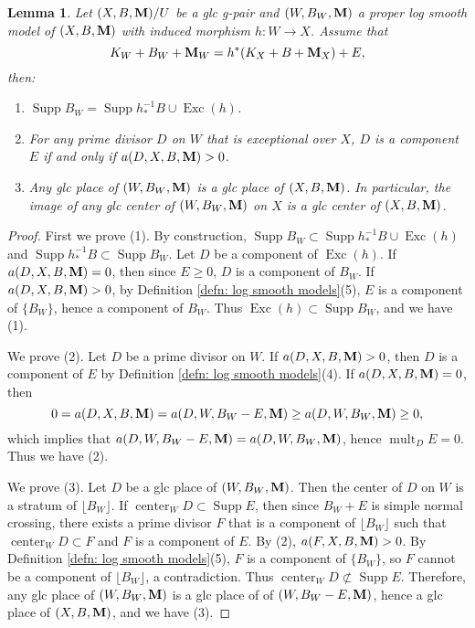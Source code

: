 \documentclass[11pt]{amsart}
\numberwithin{equation}{section}
\newcommand{\Mm}{{\bf{M}}}
\newcommand{\Center}{\operatorname{center}}
\newcommand{\Exc}{\operatorname{Exc}}
\newcommand{\Supp}{\operatorname{Supp}}
\newcommand{\mult}{\operatorname{mult}}
\newtheorem{lem}[thm]{Lemma}
\theoremstyle{definition}
\theoremstyle{definition}
\theoremstyle{definition}
\begin{document}
\begin{lem}\label{lem: proper log smooth model keep lc center}
Let $(X,B,\Mm)/U$ be a glc g-pair and $(W,B_W,\Mm)$ a proper log smooth model of $(X,B,\Mm)$ with induced morphism $h: W\rightarrow X$. Assume that
$$K_W+B_W+\Mm_W=h^*(K_X+B+\Mm_X)+E,$$
then:
\begin{enumerate}
    \item $\Supp B_W=\Supp h^{-1}_*B\cup\Exc(h)$.
    \item For any prime divisor $D$ on $W$ that is exceptional over $X$, $D$ is a component $E$ if and only if $a(D,X,B,\Mm)>0$.
    \item Any glc place of $(W,B_W,\Mm)$ is a glc place of $(X,B,\Mm)$. In particular, the image of any glc center of $(W,B_W,\Mm)$ on $X$ is a glc center of $(X,B,\Mm)$.
\end{enumerate}
\end{lem}
\begin{proof}
First we prove (1). By construction, $\Supp B_W\subset\Supp h^{-1}_*B\cup\Exc(h)$ and $\Supp h^{-1}_*B\subset\Supp B_W$. Let $D$ be a component of $\Exc(h)$. If $a(D,X,B,\Mm)=0$, then since $E\geq 0$, $D$ is a component of $B_W$. If $a(D,X,B,\Mm)>0$, by Definition \ref{defn: log smooth models}(5), $E$ is a component of $\{B_W\}$, hence a component of $B_W$. Thus $\Exc(h)\subset\Supp B_W$, and we have (1).

We prove (2). Let $D$ be a prime divisor on $W$. If $a(D,X,B,\Mm)>0$, then $D$ is a component of $E$ by Definition \ref{defn: log smooth models}(4). If $a(D,X,B,\Mm)=0$, then
$$0=a(D,X,B,\Mm)=a(D,W,B_W-E,\Mm)\geq a(D,W,B_W,\Mm)\geq 0,$$
which implies that $a(D,W,B_W-E,\Mm)=a(D,W,B_W,\Mm)$, hence $\mult_DE=0$. Thus we have (2).

We prove (3). Let $D$ be a glc place of $(W,B_W,\Mm)$. Then the center of $D$ on $W$ is a stratum of $\lfloor B_W\rfloor$. If $\Center_WD\subset\Supp E$, then since $B_W+E$ is simple normal crossing, there exists a prime divisor $F$ that is a component of $\lfloor B_W\rfloor$ such that $\Center_WD\subset F$ and $F$ is a component of $E$. By (2), $a(F,X,B,\Mm)>0$. By Definition \ref{defn: log smooth models}(5), $F$ is a component of $\{B_W\}$, so $F$ cannot be a component of $\lfloor B_W\rfloor$, a contradiction. Thus $\Center_WD\not\subset\Supp E$. Therefore, any glc place of $(W,B_W,\Mm)$ is a glc place of  of $(W,B_W-E,\Mm)$, hence a glc place of $(X,B,\Mm)$, and we have (3).
\end{proof}
\end{document}
